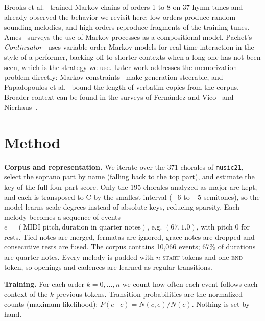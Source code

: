 \documentclass{article}
\begin{document}
Brooks et al.~\cite{brooks1957} trained Markov chains of orders 1 to 8 on 37 hymn tunes and already observed the behavior we revisit here: low orders produce random-sounding melodies, and high orders reproduce fragments of the training tunes. Ames~\cite{ames1989} surveys the use of Markov processes as a compositional model. Pachet's \emph{Continuator}~\cite{pachet2003} uses variable-order Markov models for real-time interaction in the style of a performer, backing off to shorter contexts when a long one has not been seen, which is the strategy we use. Later work addresses the memorization problem directly: Markov constraints~\cite{pachet2011} make generation steerable, and Papadopoulos et al.~\cite{papadopoulos2014} bound the length of verbatim copies from the corpus. Broader context can be found in the surveys of Fernández and Vico~\cite{fernandez2013} and Nierhaus~\cite{nierhaus2009}.

\section{Method}\label{sec:method}

\textbf{Corpus and representation.} We iterate over the 371 chorales of \texttt{music21}, select the soprano part by name (falling back to the top part), and estimate the key of the full four-part score. Only the 195 chorales analyzed as major are kept, and each is transposed to C by the smallest interval ($-6$ to $+5$ semitones), so the model learns scale degrees instead of absolute keys, reducing sparsity. Each melody becomes a sequence of events $e = (\text{MIDI pitch}, \text{duration in quarter notes})$, e.g. $(67, 1.0)$, with pitch 0 for rests. Tied notes are merged, fermatas are ignored, grace notes are dropped and consecutive rests are fused. The corpus contains 10{,}066 events; 67\% of durations are quarter notes. Every melody is padded with $n$ \textsc{start} tokens and one \textsc{end} token, so openings and cadences are learned as regular transitions.

\textbf{Training.} For each order $k=0,\dots,n$ we count how often each event follows each context of the $k$ previous tokens. Transition probabilities are the normalized counts (maximum likelihood): $P(e \mid c) = N(c, e) / N(c)$. Nothing is set by hand.
\end{document}
